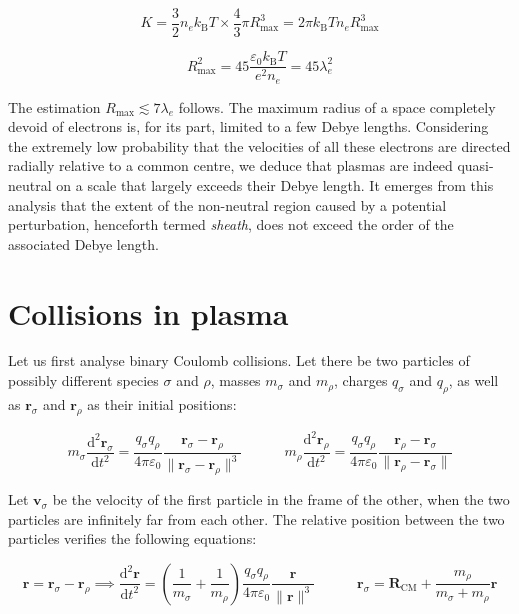 \begin{equation}
    K=\frac{3}{2}n_ek_\mathrm{B}T\times\frac{4}{3}\pi R_{\text{max}}^3 = 2\pi k_\mathrm{B}Tn_eR_\text{max}^3
\end{equation}

\begin{equation}
    R_\text{max}^2=45\frac{\varepsilon_0k_\mathrm{B}T}{e^2n_e}=45\lambda_e^2
\end{equation}

The estimation $R_\text{max}\lesssim7\lambda_e$ follows. The maximum radius of a space completely devoid of electrons is, for its part, limited to a few Debye lengths. Considering the extremely low probability that the velocities of all these electrons are directed radially relative to a common centre, we deduce that plasmas are indeed quasi-neutral on a scale that largely exceeds their Debye length. It emerges from this analysis that the extent of the non-neutral region caused by a potential perturbation, henceforth termed \textit{sheath}, does not exceed the order of the associated Debye length.

\section{Collisions in plasma}

Let us first analyse binary Coulomb collisions. Let there be two particles of possibly different species $\sigma$ and $\rho$, masses $m_\sigma$ and $m_\rho$, charges $q_\sigma$ and $q_\rho$, as well as $\mathbf{r}_\sigma$ and $\mathbf{r}_\rho$ as their initial positions:

\begin{equation}
    m_\sigma\frac{\mathrm{d}^2\mathbf{r}_\sigma}{\mathrm{d}t^2}=\frac{q_\sigma q_\rho}{4\pi\varepsilon_0}\frac{\mathbf{r}_\sigma-\mathbf{r}_\rho}{\|\mathbf{r}_\sigma-\mathbf{r}_\rho\|^3}\quad\quad\quad m_\rho\frac{\mathrm{d}^2\mathbf{r}_\rho}{\mathrm{d}t^2}=\frac{q_\sigma q_\rho}{4\pi\varepsilon_0}\frac{\mathbf{r}_\rho-\mathbf{r}_\sigma}{\|\mathbf{r}_\rho-\mathbf{r}_\sigma\|}
\end{equation}

Let $\mathbf{v}_\sigma$ be the velocity of the first particle in the frame of the other, when the two particles are infinitely far from each other. The relative position between the two particles verifies the following equations:

\begin{equation}
    \mathbf{r}=\mathbf{r}_\sigma-\mathbf{r}_\rho\implies\frac{\mathrm{d}^2\mathbf{r}}{\mathrm{d}t^2}=\left(\frac{1}{m_\sigma}+\frac{1}{m_\rho}\right)\frac{q_\sigma q_\rho}{4\pi\varepsilon_0}\frac{\mathbf{r}}{\|\mathbf{r}\|^3}\quad\quad\quad\mathbf{r}_\sigma=\mathbf{R}_\text{CM}+\frac{m_\rho}{m_\sigma+m_\rho}\mathbf{r}
\end{equation}

